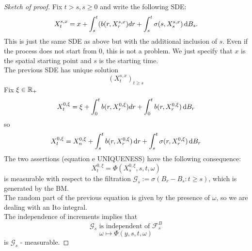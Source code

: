 \begin{ProofBox}
    \begin{proof}[Sketch of proof]
        Fix $t > s, s \geq 0$ and write the following SDE:
        \begin{equation*}
            X_t^{s,x} = x + \int_s^t (b(r,X_r^{s,x}) dr + \int_s^t \sigma(s,X_s^{s,x}) \mathop{}\!\mathrm{d} B_s.
        \end{equation*}
        This is just the same SDE as above but with the additional inclusion of $s$.
        Even if the process does not start from $0$, this is not a problem. We just specify that $x$ is the spatial starting point and $s$ is the starting time. \\
        The previous SDE has unique solution
        \begin{equation*}
            (X_t^{s,x})_{t \geq s}
        \end{equation*}
        Fix $\xi \in \mathbb{R}_+$
        \begin{equation*}
            X_t^{0,\xi} = \xi + \int_0^t b(r,X_r^{0,\xi}) dr + \int_0^t b(r,X_r^{0,\xi})\mathop{}\!\mathrm{d} B_r
        \end{equation*}
        so
        \begin{equation*}
            X_t^{0,\xi}=X_n^{0,\xi}+\int_s^tb(r,X^{0,\xi}_r)\mathop{}\!\mathrm{d} r+\int_{s}^{t}\sigma(r,X_r^{0,\xi})\mathop{}\!\mathrm{d} B_r
        \end{equation*}
        The two assertions (equation e UNIQUENESS) have the following consequence:
        \begin{equation*}
            X_t^{0,\xi} = \Phi(X_s^{0,\xi}, s, t, \omega)
        \end{equation*}
        is measurable with respect to the filtration $\mathcal{G}_s := \sigma(B_r-B_s: t \geq s)$, which is generated by the BM. \\
        The random part of the previous equation is given by the presence of $\omega$, so we are dealing with an Ito integral. \\
        The independence of increments implies that
        \begin{equation*}
            \mathcal{G}_s \text{ is independent of } \mathcal{F}_s^B
        \end{equation*}
        \begin{equation*}
            \omega \mapsto \Phi(y,s,t,\omega)
        \end{equation*}
        is $\mathcal{G}_s$ - measurable. 


\end{proof}
\end{ProofBox}
